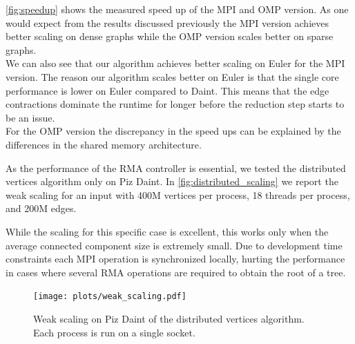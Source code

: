 \autoref{fig:speedup} shows the measured speed up of the MPI and OMP version. As one
would expect from the results discussed previously the MPI version achieves better scaling on dense
graphs while the OMP version scales better on sparse graphs.\\
We can also see that our algorithm achieves better scaling on Euler for the MPI version. The reason
our algorithm scales better on Euler is that the single core performance is lower on Euler compared
to Daint. This means that the edge contractions dominate the runtime for longer before the
reduction step starts to be an issue.\\
For the OMP version the discrepancy in the speed ups can be explained by the differences in the
shared memory architecture.

As the performance of the RMA controller is essential, we tested the distributed vertices algorithm only on Piz Daint.
In \autoref{fig:distributed_scaling} we report the weak scaling for an input with 400M vertices per
process, 18 threads per process, and 200M edges.

While the scaling for this specific case is excellent, this works only when the average connected component size is
extremely small. Due to development time constraints each MPI operation is
synchronized locally, hurting the performance in cases where several RMA operations are required to obtain the
root of a tree.

\begin{figure}%
    \texttt{[image: plots/weak\_scaling.pdf]}
    \caption{Weak scaling on Piz Daint of the distributed vertices algorithm. Each process is run
    on a single socket.}
    \label{fig:distributed_scaling}
\end{figure}
